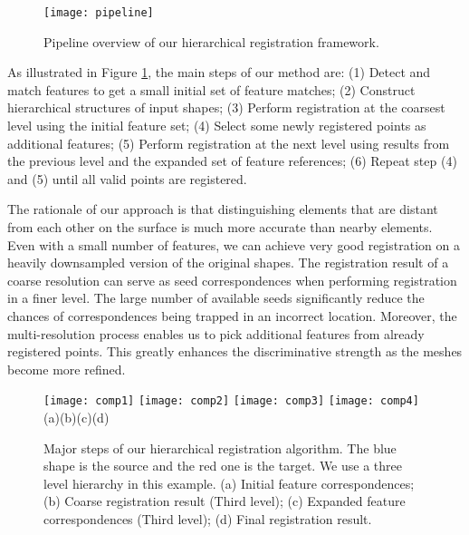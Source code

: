 \begin{figure}
\centering
  \texttt{[image: pipeline]}
  \caption{Pipeline overview of our hierarchical registration framework.}
\label{fig:pipe}
\end{figure}

As illustrated in Figure \ref{fig:pipe}, the main steps of our method are: (1) Detect and match features to get a small initial set of feature matches; (2) Construct hierarchical structures of input shapes; (3) Perform registration at the coarsest level using the initial feature set; (4) Select some newly registered points as additional features; (5) Perform registration at the next level using results from the previous level and the expanded set of feature references; (6) Repeat step (4) and (5) until all valid points are registered.

The rationale of our approach is that distinguishing elements that are distant from each other on the surface is much more accurate than nearby elements. Even with a small number of features, we can achieve very good registration on a heavily downsampled version of the original shapes. The registration result of a coarse resolution can serve as seed correspondences when performing registration in a finer level. The large number of available seeds significantly reduce the chances of correspondences being trapped in an incorrect location. Moreover, the multi-resolution process enables us to pick additional features from already registered points. This greatly enhances the discriminative strength as the meshes become more refined.

\begin{figure}
\centering
  \texttt{[image: comp1]}
\hspace{10pt}
  \texttt{[image: comp2]}
\hspace{10pt}
  \texttt{[image: comp3]}
\hspace{10pt}
  \texttt{[image: comp4]}\\
(a)\hspace{0.21\linewidth}(b)\hspace{0.21\linewidth}(c)\hspace{0.21\linewidth}(d)
  \caption[Steps of hierarchical registration algorithm.]
  {Major steps of our hierarchical registration algorithm. The blue shape is the source and the red one is the target. We use a three level hierarchy in this example. (a) Initial feature correspondences; (b) Coarse registration result (Third level); (c) Expanded feature correspondences (Third level); (d) Final registration result.}
\label{fig:components}
\end{figure}

